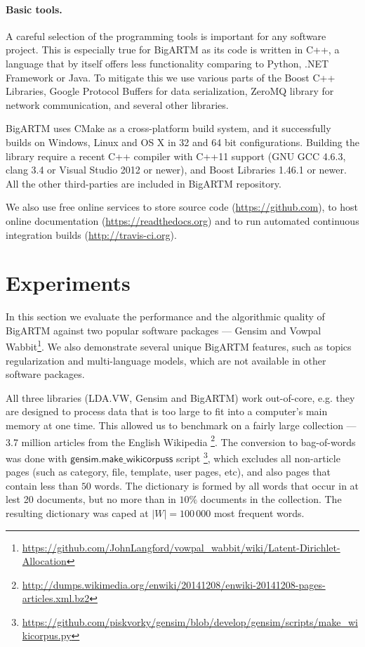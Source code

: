 \documentclass[russian]{llncs}
\newcommand{\kw}[1]{\textsf{#1}}
\begin{document}
\paragraph{Basic tools.}
A careful selection of the programming tools is important for any software project.
This is especially true for BigARTM as its code is written in C++,
a language that by itself offers less functionality comparing to Python, .NET Framework or Java.
To mitigate this we use
various parts of the Boost C++ Libraries,
Google Protocol Buffers for data serialization,
ZeroMQ library for network communication,
and several other libraries.

BigARTM uses CMake as a cross-platform build system,
and it successfully builds on Windows, Linux and OS X in 32 and 64 bit configurations.
Building the library require a recent C++ compiler with C++11 support (GNU GCC 4.6.3, clang 3.4 or Visual Studio 2012 or newer),
and Boost Libraries 1.46.1 or newer. All the other third-parties are included in BigARTM repository.

We also use free online services
to store source code (\url{https://github.com}),
to host online documentation (\url{https://readthedocs.org}) and
to run automated continuous integration builds (\url{http://travis-ci.org}).

\section{Experiments}
\label{sec:Experiments}

In this section we evaluate the performance and the algorithmic quality of \mbox{BigARTM} against two popular software packages ---
Gensim \cite{rehurek_lrec}  %
and Vowpal Wabbit\footnote{\url{https://github.com/JohnLangford/vowpal_wabbit/wiki/Latent-Dirichlet-Allocation}}.
We also demonstrate several unique BigARTM features, such as topics regularization and multi-language models,
which are not available in other software packages.

All three libraries (LDA.VW, Gensim and BigARTM) work out-of-core,
e.g. they are designed to process data that is too large to fit into a computer's main memory at one time.
This allowed us to benchmark on a fairly large collection --- 3.7 million articles from the English Wikipedia
\footnote{\url{http://dumps.wikimedia.org/enwiki/20141208/enwiki-20141208-pages-articles.xml.bz2}}.
The conversion to bag-of-words was done with $\kw{gensim.make\_wikicorpuss}$ script
\footnote{\url{https://github.com/piskvorky/gensim/blob/develop/gensim/scripts/make_wikicorpus.py}},
which excludes all non-article pages (such as category, file, template, user pages, etc),
and also pages that contain less than $50$ words.
The dictionary is formed by all words that occur in at lest 20 documents,
but no more than in $10\%$ documents in the collection.
The resulting dictionary was caped at $|W| = 100\,000$ most frequent words.
\end{document}
